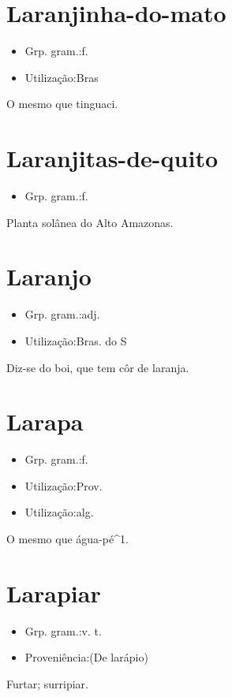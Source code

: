 \section{Laranjinha-do-mato}
\begin{itemize}
\item {Grp. gram.:f.}
\end{itemize}
\begin{itemize}
\item {Utilização:Bras}
\end{itemize}
O mesmo que \textunderscore tinguaci\textunderscore .
\section{Laranjitas-de-quito}
\begin{itemize}
\item {Grp. gram.:f.}
\end{itemize}
Planta solânea do Alto Amazonas.
\section{Laranjo}
\begin{itemize}
\item {Grp. gram.:adj.}
\end{itemize}
\begin{itemize}
\item {Utilização:Bras. do S}
\end{itemize}
Diz-se do boi, que tem côr de laranja.
\section{Larapa}
\begin{itemize}
\item {Grp. gram.:f.}
\end{itemize}
\begin{itemize}
\item {Utilização:Prov.}
\end{itemize}
\begin{itemize}
\item {Utilização:alg.}
\end{itemize}
O mesmo que \textunderscore água-pé\textunderscore ^1.
\section{Larapiar}
\begin{itemize}
\item {Grp. gram.:v. t.}
\end{itemize}
\begin{itemize}
\item {Proveniência:(De \textunderscore larápio\textunderscore )}
\end{itemize}
Furtar; surripiar.
